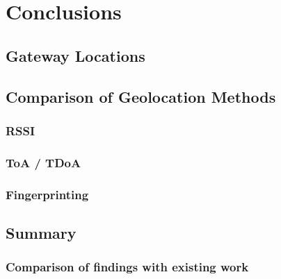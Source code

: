 \chapter{Conclusions}

\section{Gateway Locations}


\section{Comparison of Geolocation Methods}



\subsection{\acf{RSSI}}


\subsection{\acf{ToA} / \acf{TDoA}}


\subsection{Fingerprinting}


\section{Summary}


\subsection{Comparison of findings with existing work}


